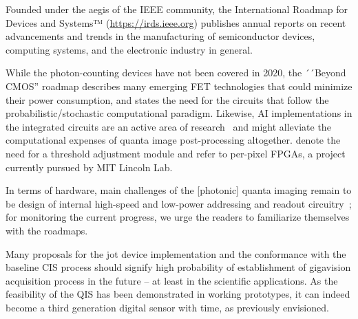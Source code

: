 Founded under the aegis of the IEEE community, the International Roadmap for Devices and Systems™ (\url{https://irds.ieee.org}) publishes annual reports on recent advancements and trends in the manufacturing of semiconductor devices, computing systems, and the electronic industry in general. 

While the photon-counting devices have not been covered in 2020, the ´´Beyond CMOS'' roadmap describes many emerging FET technologies that could minimize their power consumption, and states the need for the circuits that follow the probabilistic/stochastic computational paradigm. Likewise, AI implementations in the integrated circuits are an active area of research~\cite{hao2021recent} and might alleviate the computational expenses of quanta image post-processing altogether. \cite{qisthreshold} denote the need for a threshold adjustment module and refer to per-pixel FPGAs, a project currently pursued by MIT Lincoln Lab.

In terms of hardware, main challenges of the [photonic] quanta imaging remain to be design of internal high-speed and low-power addressing and readout circuitry~\cite{Masoodian16}; for monitoring the current progress, we urge the readers to familiarize themselves with the roadmaps. 

Many proposals for the jot device implementation and the conformance with the baseline CIS process should signify high probability of establishment of gigavision acquisition process in the future -- at least in the scientific applications. As the feasibility of the QIS has been demonstrated in working prototypes, it can indeed become a third generation digital sensor with time, as previously envisioned.
%